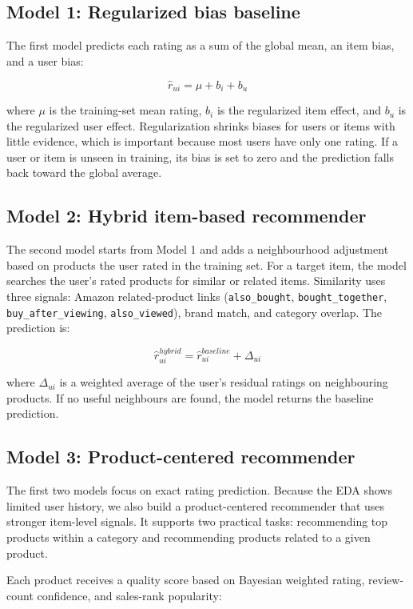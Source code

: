 \documentclass[11pt,a4paper]{article}
\begin{document}
\subsection{Model 1: Regularized bias baseline}

The first model predicts each rating as a sum of the global mean, an item bias, and a user bias:

\[
\hat r_{ui} = \mu + b_i + b_u
\]

where $\mu$ is the training-set mean rating, $b_i$ is the regularized item effect, and $b_u$ is the regularized user effect. Regularization shrinks biases for users or items with little evidence, which is important because most users have only one rating. If a user or item is unseen in training, its bias is set to zero and the prediction falls back toward the global average.

\subsection{Model 2: Hybrid item-based recommender}

The second model starts from Model 1 and adds a neighbourhood adjustment based on products the user rated in the training set. For a target item, the model searches the user's rated products for similar or related items. Similarity uses three signals: Amazon related-product links (\texttt{also\_bought}, \texttt{bought\_together}, \texttt{buy\_after\_viewing}, \texttt{also\_viewed}), brand match, and category overlap. The prediction is:

\[
\hat r_{ui}^{hybrid} = \hat r_{ui}^{baseline} + \Delta_{ui}
\]

where $\Delta_{ui}$ is a weighted average of the user's residual ratings on neighbouring products. If no useful neighbours are found, the model returns the baseline prediction.

\subsection{Model 3: Product-centered recommender}

The first two models focus on exact rating prediction. Because the EDA shows limited user history, we also build a product-centered recommender that uses stronger item-level signals. It supports two practical tasks: recommending top products within a category and recommending products related to a given product.

Each product receives a quality score based on Bayesian weighted rating, review-count confidence, and sales-rank popularity:
\end{document}
